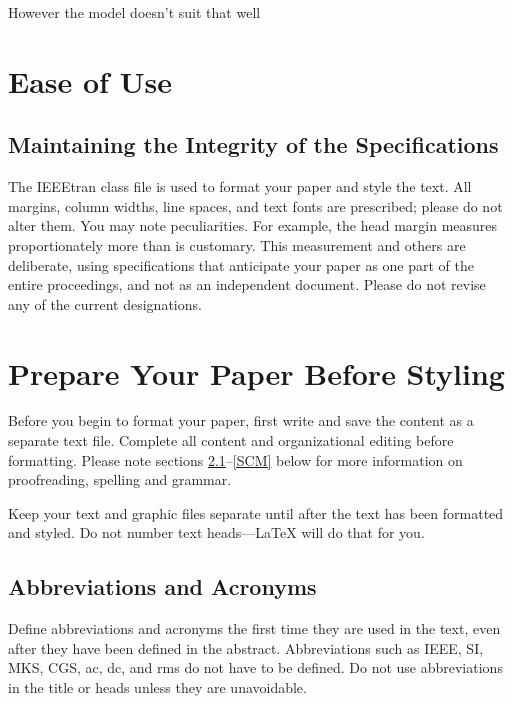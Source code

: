\documentclass[conference]{IEEEtran}
\begin{document}
However the model doesn't suit that well

\section{Ease of Use}

\subsection{Maintaining the Integrity of the Specifications}

The IEEEtran class file is used to format your paper and style the text. All margins, 
column widths, line spaces, and text fonts are prescribed; please do not 
alter them. You may note peculiarities. For example, the head margin
measures proportionately more than is customary. This measurement 
and others are deliberate, using specifications that anticipate your paper 
as one part of the entire proceedings, and not as an independent document. 
Please do not revise any of the current designations.

\section{Prepare Your Paper Before Styling}
Before you begin to format your paper, first write and save the content as a 
separate text file. Complete all content and organizational editing before 
formatting. Please note sections \ref{AA}--\ref{SCM} below for more information on 
proofreading, spelling and grammar.

Keep your text and graphic files separate until after the text has been 
formatted and styled. Do not number text heads---{\LaTeX} will do that 
for you.

\subsection{Abbreviations and Acronyms}\label{AA}
Define abbreviations and acronyms the first time they are used in the text, 
even after they have been defined in the abstract. Abbreviations such as 
IEEE, SI, MKS, CGS, ac, dc, and rms do not have to be defined. Do not use 
abbreviations in the title or heads unless they are unavoidable.
\end{document}
